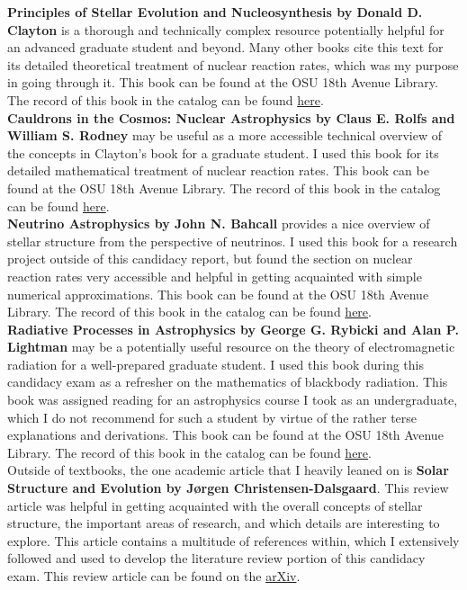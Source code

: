 \documentclass[12pt]{article}
\begin{document}
\textbf{Principles of Stellar Evolution and Nucleosynthesis by Donald D. Clayton} is a thorough and technically complex resource potentially helpful for an advanced graduate student and beyond. Many other books cite this text for its detailed theoretical treatment of nuclear reaction rates, which was my purpose in going through it. This book can be found at the OSU 18th Avenue Library. The record of this book in the catalog can be found \href{https://library.ohio-state.edu/record=b1131545~S7}{here}.\\

\textbf{Cauldrons in the Cosmos: Nuclear Astrophysics by Claus E. Rolfs and William S. Rodney} may be useful as a more accessible technical overview of the concepts in Clayton's book for a graduate student. I used this book for its detailed mathematical treatment of nuclear reaction rates. This book can be found at the OSU 18th Avenue Library. The record of this book in the catalog can be found \href{https://library.ohio-state.edu/record=b2222792~S7}{here}.\\

\textbf{Neutrino Astrophysics by John N. Bahcall} provides a nice overview of stellar structure from the perspective of neutrinos. I used this book for a research project outside of this candidacy report, but found the section on nuclear reaction rates very accessible and helpful in getting acquainted with simple numerical approximations. This book can be found at the OSU 18th Avenue Library. The record of this book in the catalog can be found \href{https://library.ohio-state.edu/record=b2471768~S7}{here}.\\

\textbf{Radiative Processes in Astrophysics by George G. Rybicki and Alan P. Lightman} may be a potentially useful resource on the theory of electromagnetic radiation for a well-prepared graduate student. I used this book during this candidacy exam as a refresher on the mathematics of blackbody radiation. This book was assigned reading for an astrophysics course I took as an undergraduate, which I do not recommend for such a student by virtue of the rather terse explanations and derivations. This book can be found at the OSU 18th Avenue Library. The record of this book in the catalog can be found \href{https://library.ohio-state.edu/record=b1932436~S7}{here}.\\ 

Outside of textbooks, the one academic article that I heavily leaned on is \textbf{Solar Structure and Evolution by J\o{}rgen Christensen-Dalsgaard}. This review article was helpful in getting acquainted with the overall concepts of stellar structure, the important areas of research, and which details are interesting to explore. This article contains a multitude of references within, which I extensively followed and used to develop the literature review portion of this candidacy exam. This review article can be found on the \href{https://arxiv.org/abs/2007.06488v2}{arXiv}.
\end{document}
